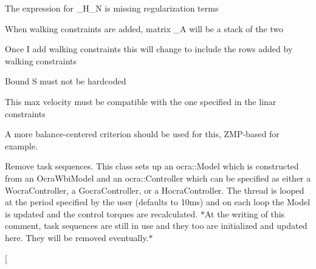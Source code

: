 \begin{DoxyRefList}
\-The expression for \-\_\-\-H\-\_\-\-N is missing regularization terms  
\item[\label{todo__todo000005}%
\hypertarget{todo__todo000005}{}%
\-Member \hyperlink{classMIQPLinearConstraints_a2f41d99a16293718b94d17ce9ee5b59d}{\-M\-I\-Q\-P\-Linear\-Constraints\-:\-:build\-Shape\-And\-Admissibility\-In\-Preview\-Window} ()]\-When walking constraints are added, matrix \-\_\-\-A will be a stack of the two  
\item[\label{todo__todo000004}%
\hypertarget{todo__todo000004}{}%
\-Member \hyperlink{classMIQPLinearConstraints_a95076997a625d0e74185924775cdabc5}{\-M\-I\-Q\-P\-Linear\-Constraints\-:\-:\-M\-I\-Q\-P\-Linear\-Constraints} (std\-::shared\-\_\-ptr$<$ Step\-Controller $>$ step\-Controller, \hyperlink{structMIQPParameters}{\-M\-I\-Q\-P\-Parameters} \&miqp\-Params)]\-Once \-I add walking constraints this will change to include the rows added by walking constraints  
\item[\label{todo__todo000006}%
\hypertarget{todo__todo000006}{}%
\-Member \hyperlink{classSingleSupport_a78e5b7c89b828d718560cec73c0f6218}{\-Single\-Support\-:\-:build\-Matrix\-Ci} ()]\-Bound \-S must not be hardcoded  
\item[\label{todo__todo000009}%
\hypertarget{todo__todo000009}{}%
\-Member \hyperlink{classStepController_a8f061f201c651d920ca02f7daa07adfe}{\-Step\-Controller\-:\-:initialize} ()]\-This max velocity must be compatible with the one specified in the linar constraints  
\item[\label{todo__todo000002}%
\hypertarget{todo__todo000002}{}%
\-Member \hyperlink{classSteppingDemoClient_ad8fbc186267a47a73bb77e78199f2b8c}{\-Stepping\-Demo\-Client\-:\-:is\-Balanced} ()]\-A more balance-\/centered criterion should be used for this, \-Z\-M\-P-\/based for example.  
\item[\label{todo__todo000001}%
\hypertarget{todo__todo000001}{}%
\-Class \hyperlink{classThread}{\-Thread} ]\-Remove task sequences. \-This class sets up an ocra\-::\-Model which is constructed from an \-Ocra\-Wbi\-Model and an ocra\-::\-Controller which can be specified as either a \-Wocra\-Controller, a \-Gocra\-Controller, or a \-Hocra\-Controller. \-The thread is looped at the period specified by the user (defaults to 10ms) and on each loop the \-Model is updated and the control torques are recalculated. $\ast$\-At the writing of this comment, task sequences are still in use and they too are initialized and updated here. \-They will be removed eventually.$\ast$  
\item[\label{todo__todo000011}%

\end{DoxyRefList}
